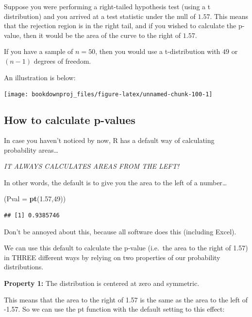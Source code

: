 \documentclass[
]{book}
\newenvironment{Shaded}{\begin{snugshade}}{\end{snugshade}}
\newcommand{\AttributeTok}[1]{\textcolor[rgb]{0.13,0.29,0.53}{#1}}
\newcommand{\DecValTok}[1]{\textcolor[rgb]{0.00,0.00,0.81}{#1}}
\newcommand{\FloatTok}[1]{\textcolor[rgb]{0.00,0.00,0.81}{#1}}
\newcommand{\FunctionTok}[1]{\textcolor[rgb]{0.13,0.29,0.53}{\textbf{#1}}}
\newcommand{\NormalTok}[1]{#1}
\begin{document}
Suppose you were performing a right-tailed hypothesis test (using a t distribution) and you arrived at a test statistic under the null of \(1.57\). This means that the rejection region is in the right tail, and if you wished to calculate the p-value, then it would be the area of the curve to the right of \(1.57\).

If you have a sample of \(n = 50\), then you would use a t-distribution with \(49\) or \((n-1)\) degrees of freedom.

An illustration is below:

\begin{center}\texttt{[image: bookdownproj\_files/figure-latex/unnamed-chunk-100-1]} \end{center}

\subsection{How to calculate p-values}\label{how-to-calculate-p-values}

In case you haven't noticed by now, R has a default way of calculating probability areas\ldots{}

\emph{IT ALWAYS CALCULATES AREAS FROM THE LEFT!}

In other words, the default is to give you the area to the left of a number\ldots{}

\begin{Shaded}
\begin{Highlighting}[]
\NormalTok{(}\AttributeTok{Pval =} \FunctionTok{pt}\NormalTok{(}\FloatTok{1.57}\NormalTok{,}\DecValTok{49}\NormalTok{))}
\end{Highlighting}
\end{Shaded}

\begin{verbatim}
## [1] 0.9385746
\end{verbatim}

Don't be annoyed about this, because all software does this (including Excel).

We can use this default to calculate the p-value (i.e.~the area to the right of 1.57) in THREE different ways by relying on two properties of our probability distributions.

\textbf{Property 1:} The distribution is centered at zero and symmetric.

This means that the area to the right of 1.57 is the same as the area to the left of -1.57. So we can use the pt function with the default setting to this effect:
\end{document}
